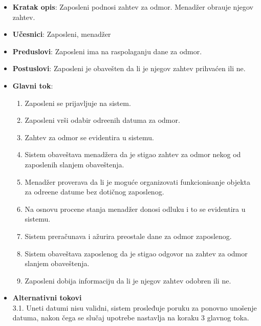   
 \begin{itemize}
    \item \textbf{Kratak opis}:
   Zaposleni podnosi zahtev za odmor. Menad\v zer obra\dj uje njegov zahtev.
    \item \textbf{Učesnici}:
    Zaposleni, menad\v zer
    \item \textbf{Preduslovi}: Zaposleni ima na raspolaganju dane za odmor.
    \item \textbf{Postuslovi}:
    Zaposleni je obave\v sten da li je njegov zahtev prihva\'cen ili ne.
    \item \textbf{Glavni tok}:
    \begin{enumerate}
        \item Zaposleni se prijavljuje na sistem.
        \item Zaposleni vr\v si odabir odre\dj enih datuma za odmor.
        \item Zahtev za odmor se evidentira u sistemu. 
        \item Sistem obave\v stava menad\v zera da je stigao zahtev za odmor nekog od zaposlenih slanjem obaveštenja.
        \item Menad\v zer proverava da li je moguće organizovati funkcionisanje objekta za odre\dj ene datume bez dotičnog zaposlenog.
        \item Na osnovu procene stanja menad\v zer donosi odluku i to se evidentira u sistemu.
        \item Sistem prera\v cunava i a\v zurira preostale dane za odmor zaposlenog.
        \item Sistem obave\v stava zaposlenog da je stigao odgovor na zahtev za odmor slanjem obaveštenja.
        \item Zaposleni dobija informaciju da li je njegov zahtev odobren ili ne.
    \end{enumerate}
\item \textbf{Alternativni tokovi}\\
        3.1. Uneti datumi nisu validni, sistem prosleđuje poruku za ponovno unošenje datuma, nakon čega se slučaj upotrebe nastavlja na koraku 3 glavnog toka.

 \end{itemize}
 
 
 
